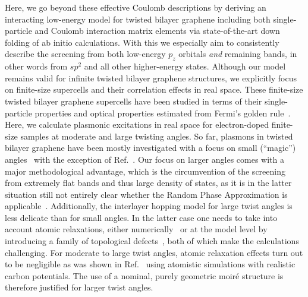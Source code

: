 Here, we go beyond these effective Coulomb descriptions by deriving an interacting low-energy model for twisted bilayer graphene including both single-particle and Coulomb interaction matrix elements via state-of-the-art down folding of ab initio calculations.  With this we especially aim to consistently describe the screening from both low-energy $p_z$ orbitals \emph{and} remaining bands, in other words from $sp^2$ and all other higher-energy states.  Although our model remains valid for infinite twisted bilayer graphene structures, we explicitly focus on finite-size supercells and their correlation effects in real space. These finite-size twisted bilayer graphene supercells have been studied in terms of their single-particle properties and optical properties estimated from Fermi's golden rule~\cite{mirzakhani2020circular,tepliakov2020twisted}. Here, we calculate plasmonic excitations in real space for electron-doped finite-size samples at moderate and large twisting angles. So far, plasmons in twisted bilayer graphene have been mostly investigated with a focus on small (``magic'') angles~\cite{sunku_photonic_2018,lewandowski_intrinsically_2019,hesp_collective_2019,novelli_optical_2020,kuang2021collective} with the exception of Ref.~\cite{hu_real-space_2017}.  Our focus on larger angles comes with a major methodological advantage, which is the circumvention of the screening from extremely flat bands and thus large density of states, as it is in the latter situation still not entirely clear whether the Random Phase Approximation is applicable~\cite{katsnelson_anomalies_1985,irkhin_robustness_2002,stepanov_coexisting_2021}. Additionally, the interlayer hopping model for large twist angles is less delicate than for small angles. In the latter case one needs to take into account atomic relaxations, either numerically~\cite{shi_large-area_2020} or at the model level by introducing a family of topological defects~\cite{gornostyrev_origin_2020}, both of which make the calculations challenging. For moderate to large twist angles, atomic relaxation effects turn out to be negligible as was shown in Ref.~\cite{wijk_relaxation_2015} using atomistic simulations with realistic carbon potentials. The use of a nominal, purely geometric moir{\'e} structure is therefore justified for larger twist angles. 
    
